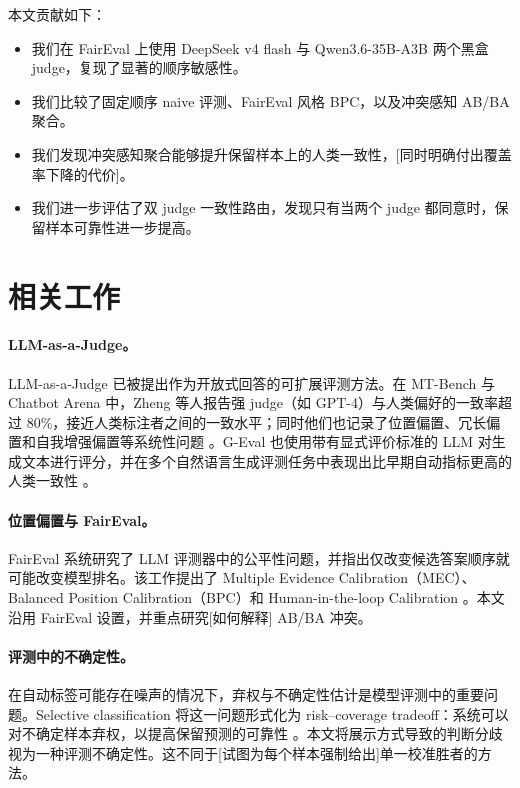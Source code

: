 \documentclass[11pt]{ctexart}
\begin{document}
本文贡献如下：
\begin{itemize}
    \item 我们在 FairEval 上使用 DeepSeek v4 flash 与 Qwen3.6-35B-A3B 两个黑盒 judge，复现了显著的顺序敏感性。
    \item 我们比较了固定顺序 naive 评测、FairEval 风格 BPC，以及冲突感知 AB/BA 聚合。
    \item 我们发现冲突感知聚合能够提升保留样本上的人类一致性，[同时明确付出覆盖率下降的代价]。
    \item 我们进一步评估了双 judge 一致性路由，发现只有当两个 judge 都同意时，保留样本可靠性进一步提高。
\end{itemize}

\section{相关工作}

\paragraph{LLM-as-a-Judge。}
LLM-as-a-Judge 已被提出作为开放式回答的可扩展评测方法。在 MT-Bench 与 Chatbot Arena 中，Zheng 等人报告强 judge（如 GPT-4）与人类偏好的一致率超过 80\%，接近人类标注者之间的一致水平；同时他们也记录了位置偏置、冗长偏置和自我增强偏置等系统性问题 \cite{zheng2023judging}。G-Eval 也使用带有显式评价标准的 LLM 对生成文本进行评分，并在多个自然语言生成评测任务中表现出比早期自动指标更高的人类一致性 \cite{liu2023geval}。

\paragraph{位置偏置与 FairEval。}
FairEval 系统研究了 LLM 评测器中的公平性问题，并指出仅改变候选答案顺序就可能改变模型排名。该工作提出了 Multiple Evidence Calibration（MEC）、Balanced Position Calibration（BPC）和 Human-in-the-loop Calibration \cite{wang2024faireval}。本文沿用 FairEval 设置，并重点研究[如何解释] AB/BA 冲突。

\paragraph{评测中的不确定性。}
在自动标签可能存在噪声的情况下，弃权与不确定性估计是模型评测中的重要问题。Selective classification 将这一问题形式化为 risk--coverage tradeoff：系统可以对不确定样本弃权，以提高保留预测的可靠性 \cite{geifman2017selective}。本文将展示方式导致的判断分歧视为一种评测不确定性。这不同于[试图为每个样本强制给出]单一校准胜者的方法。
\end{document}
